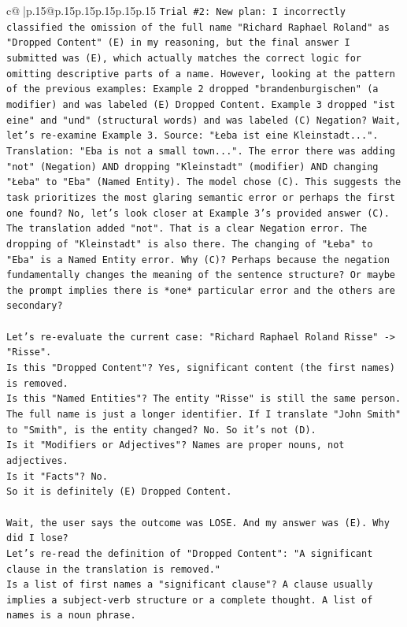 \documentclass{article}
\begin{document}
{\begin{supertabular}{c@{$\;$}|p{.15\linewidth}@{}p{.15\linewidth}p{.15\linewidth}p{.15\linewidth}p{.15\linewidth}p{.15\linewidth}}
{{{\texttt{Trial \#2: New plan: I incorrectly classified the omission of the full name "Richard Raphael Roland" as "Dropped Content" (E) in my reasoning, but the final answer I submitted was (E), which actually matches the correct logic for omitting descriptive parts of a name. However, looking at the pattern of the previous examples: Example 2 dropped "brandenburgischen" (a modifier) and was labeled (E) Dropped Content. Example 3 dropped "ist eine" and "und" (structural words) and was labeled (C) Negation? Wait, let's re{-}examine Example 3. Source: "Łeba ist eine Kleinstadt...". Translation: "Eba is not a small town...". The error there was adding "not" (Negation) AND dropping "Kleinstadt" (modifier) AND changing "Łeba" to "Eba" (Named Entity). The model chose (C). This suggests the task prioritizes the most glaring semantic error or perhaps the first one found? No, let's look closer at Example 3's provided answer (C). The translation added "not". That is a clear Negation error. The dropping of "Kleinstadt" is also there. The changing of "Łeba" to "Eba" is a Named Entity error. Why (C)? Perhaps because the negation fundamentally changes the meaning of the sentence structure? Or maybe the prompt implies there is *one* particular error and the others are secondary?} \\
\\ 
\texttt{Let's re{-}evaluate the current case: "Richard Raphael Roland Risse" {-}> "Risse".} \\
\texttt{Is this "Dropped Content"? Yes, significant content (the first names) is removed.} \\
\texttt{Is this "Named Entities"? The entity "Risse" is still the same person. The full name is just a longer identifier. If I translate "John Smith" to "Smith", is the entity changed? No. So it's not (D).} \\
\texttt{Is it "Modifiers or Adjectives"? Names are proper nouns, not adjectives.} \\
\texttt{Is it "Facts"? No.} \\
\texttt{So it is definitely (E) Dropped Content.} \\
\\ 
\texttt{Wait, the user says the outcome was LOSE. And my answer was (E). Why did I lose?} \\
\texttt{Let's re{-}read the definition of "Dropped Content": "A significant clause in the translation is removed."} \\
\texttt{Is a list of first names a "significant clause"? A clause usually implies a subject{-}verb structure or a complete thought. A list of names is a noun phrase.} \\
}}}
\end{supertabular}}
\end{document}
